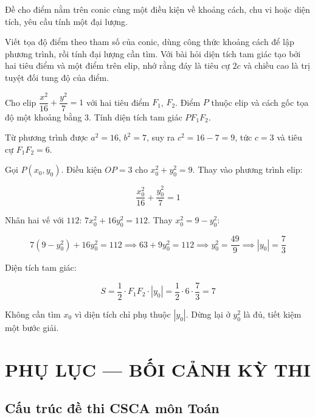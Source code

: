 \documentclass[11pt, a4paper]{article}
\begin{document}
 Đề cho điểm nằm trên conic cùng một điều kiện về khoảng cách, chu vi hoặc diện tích, yêu cầu tính một đại lượng.

 Viết tọa độ điểm theo tham số của conic, dùng công thức khoảng cách để lập phương trình, rồi tính đại lượng cần tìm. Với bài hỏi diện tích tam giác tạo bởi hai tiêu điểm và một điểm trên elip, nhớ rằng đáy là tiêu cự $2c$ và chiều cao là trị tuyệt đối tung độ của điểm.

\begin{vidu}[{6}]
Cho elip $\dfrac{x^2}{16} + \dfrac{y^2}{7} = 1$ với hai tiêu điểm $F_1$, $F_2$. Điểm $P$ thuộc elip và cách gốc tọa độ một khoảng bằng $3$. Tính diện tích tam giác $PF_1F_2$.

Từ phương trình được $a^2 = 16$, $b^2 = 7$, suy ra $c^2 = 16 - 7 = 9$, tức $c = 3$ và tiêu cự $F_1F_2 = 6$.

Gọi $P(x_0, y_0)$. Điều kiện $OP = 3$ cho $x_0^2 + y_0^2 = 9$. Thay vào phương trình elip:

$$\frac{x_0^2}{16} + \frac{y_0^2}{7} = 1$$

Nhân hai vế với $112$: $7x_0^2 + 16y_0^2 = 112$. Thay $x_0^2 = 9 - y_0^2$:

$$7(9 - y_0^2) + 16y_0^2 = 112 \implies 63 + 9y_0^2 = 112 \implies y_0^2 = \frac{49}{9} \implies |y_0| = \frac{7}{3}$$

Diện tích tam giác:

$$S = \frac{1}{2} \cdot F_1F_2 \cdot |y_0| = \frac{1}{2} \cdot 6 \cdot \frac{7}{3} = 7$$

 Không cần tìm $x_0$ vì diện tích chỉ phụ thuộc $|y_0|$. Dừng lại ở $y_0^2$ là đủ, tiết kiệm một bước giải.

\end{vidu}
\section{PHỤ LỤC — BỐI CẢNH KỲ THI}

\subsection{Cấu trúc đề thi CSCA môn Toán}

\end{document}
